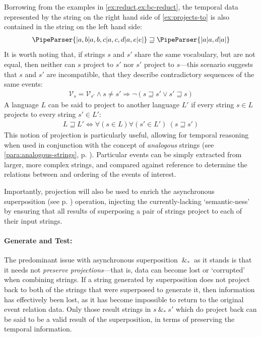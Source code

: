 \documentclass[a4paper,12pt,leqno]{article}
\newcommand{\vph}[1]{\vphantom{#1}}
\newcommand{\ebox}[1]{\fbox{$\vph{'(),}#1$}}
\newcommand{\spasync}{~\&_*~}
\newcommand{\V}{\mathcal{V}}
\newcommand{\EventString}[1]{%
	\renewcommand*{\do}[1]{\ebox{##1}}%
	\PipeParser{#1}%
}
\begin{document}
Borrowing from the examples in \cref{ex:reduct,ex:bc-reduct}, the temporal data represented by the string on the right hand side of \cref{ex:projects-to} is also contained in the string on the left hand side:
\begin{align}\label{ex:projects-to}
	\EventString{{}|a,b|a,b,c|a,c,d|a,e|e|{}} \sqsupseteq \EventString{{}|a|a,d|a|{}}
\end{align}
It is worth noting that, if strings $s$ and $s'$ share the same vocabulary, but are not equal, then neither can $s$ project to $s'$ nor $s'$ project to $s$---this scenario suggests that $s$ and $s'$ are incompatible, that they describe contradictory sequences of the same events:
\begin{align}\label{impl:cannot-project}
	\V_s = \V_{s'} \wedge s \neq s' \Longrightarrow \lnot (s \sqsupseteq s' \lor s' \sqsupseteq s)
\end{align}
A language $L$ can be said to project to another language $L'$ if every string $s \in L$ projects to every string $s' \in L'$:
\begin{align}
	L \sqsupseteq L' \Longleftrightarrow  \forall (s \in L)\forall (s' \in L')~ (s \sqsupseteq s')\label{def:lang-projection}
\end{align}
This notion of projection is particularly useful, allowing for temporal reasoning when used in conjunction with the concept of \textit{analogous} strings (see \cref{para:analogous-strings}, p. \pageref{para:analogous-strings}). Particular events can be simply extracted from larger, more complex strings, and compared against reference to determine the relations between and ordering of the events of interest.

Importantly, projection will also be used to enrich the asynchronous superposition (see p. \pageref{def:async-superposition}) operation, injecting the currently-lacking `semantic-ness' by ensuring that all results of superposing a pair of strings project to each of their input strings.

\paragraph{Generate and Test:}\label{para:gen-and-test}
The predominant issue with asynchronous superposition $\spasync$ as it stands is that it needs not \textit{preserve projections}---that is, data can become lost or `corrupted' when combining strings. If a string generated by superposition does not project back to both of the strings that were superposed to generate it, then information has effectively been lost, as it has become impossible to return to the original event relation data. Only those result strings in $s \spasync s'$ which do project back can be said to be a valid result of the superposition, in terms of preserving the temporal information.
\end{document}
